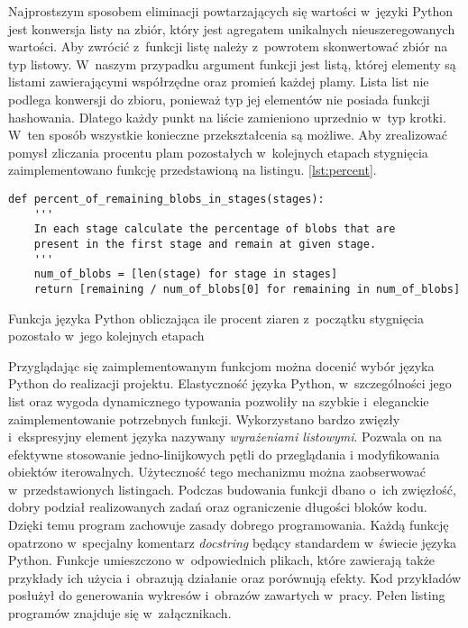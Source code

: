 Najprostszym sposobem eliminacji powtarzających się wartości w~języki Python
jest konwersja listy na zbiór, który jest agregatem unikalnych 
nieuszeregowanych wartości.
Aby zwrócić z~funkcji listę należy z~powrotem skonwertować zbiór na typ
listowy.
W~naszym przypadku argument funkcji jest listą, której elementy są listami
zawierającymi współrzędne oraz promień każdej plamy.
Lista list nie podlega konwersji do zbioru, ponieważ typ jej elementów
nie posiada funkcji hashowania.
Dlatego każdy punkt na liście zamieniono uprzednio w~typ krotki.
W~ten sposób wszystkie konieczne przekształcenia są możliwe.
Aby zrealizować pomysł zliczania procentu plam pozostałych w~kolejnych etapach
stygnięcia zaimplementowano funkcję przedstawioną na listingu.
\ref{lst:percent}.
\begin{listing}[htbp]
\begin{verbatim}
def percent_of_remaining_blobs_in_stages(stages):
    '''
    In each stage calculate the percentage of blobs that are
    present in the first stage and remain at given stage.
    '''
    num_of_blobs = [len(stage) for stage in stages]
    return [remaining / num_of_blobs[0] for remaining in num_of_blobs]
\end{verbatim}
\caption{Funkcja języka Python obliczająca ile procent ziaren z~początku
         stygnięcia pozostało w~jego kolejnych etapach}
\label{lst:percent}
\end{listing}

Przyglądając się zaimplementowanym funkcjom można docenić wybór języka
Python do realizacji projektu.
Elastyczność języka Python, w~szczególności jego list oraz wygoda
dynamicznego typowania pozwoliły na szybkie i~eleganckie zaimplementowanie
potrzebnych funkcji.
Wykorzystano bardzo zwięzły i~ekspresyjny element języka nazywany
\emph{wyrażeniami listowymi}.
Pozwala on na efektywne stosowanie jedno-linijkowych pętli do przeglądania
i modyfikowania obiektów iterowalnych.
Użyteczność tego mechanizmu można zaobserwować w~przedstawionych listingach.
Podczas budowania funkcji dbano o~ich zwięzłość, dobry podział realizowanych
zadań oraz ograniczenie długości bloków kodu.
Dzięki temu program zachowuje zasady dobrego programowania.
Każdą funkcję opatrzono w~specjalny komentarz \emph{docstring} będący
standardem w~świecie języka Python.
Funkcje umieszczono w~odpowiednich plikach, które zawierają także
przykłady ich użycia i~obrazują działanie oraz porównują efekty.
Kod przykładów posłużył do generowania wykresów i~obrazów zawartych
w~pracy.
Pełen listing programów znajduje się w~załącznikach.


